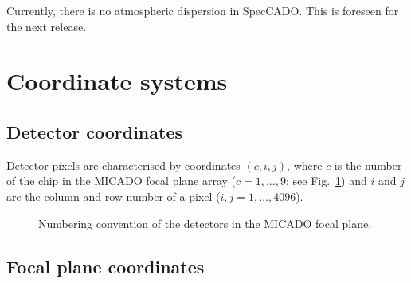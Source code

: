 \documentclass[a4paper,twoside,11pt]{article}
\begin{document}
Currently, there is no atmospheric dispersion in SpecCADO. This is
foreseen for the next release.


\section{Coordinate systems}
\label{sec:coordinates}

\subsection{Detector coordinates}

Detector pixels are characterised by coordinates $(c, i, j)$, where
$c$ is the number of the chip in the MICADO focal plane array
($c=1,\dots,9$; see Fig.~\ref{fig:detector_layout}) and $i$ and $j$
are the column and row number of a pixel ($i, j = 1,\dots,4096$).

\begin{figure}[b]
  \centering
  \caption{Numbering convention of the detectors in the MICADO focal
    plane.}
  \label{fig:detector_layout}
\end{figure}

\subsection{Focal plane coordinates}
\end{document}
